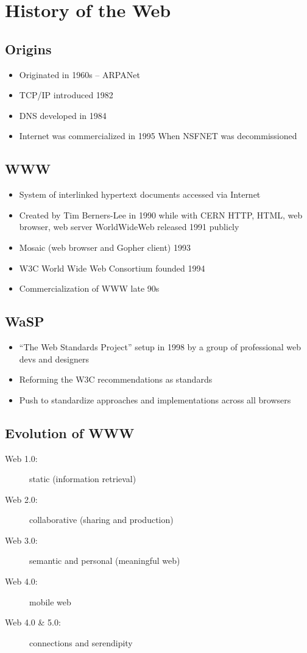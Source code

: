 \section{History of the Web}
\subsection{Origins}
\begin{itemize}
	\item Originated in 1960s -- ARPANet
	\item TCP/IP introduced 1982
	\item DNS developed in 1984
	\item Internet was commercialized in 1995
	\subitem When NSFNET was decommissioned
\end{itemize}

\subsection{WWW}
\begin{itemize}
	\item System of interlinked hypertext documents accessed via Internet
	\item Created by Tim Berners-Lee in 1990 while with CERN
	\subitem HTTP, HTML, web browser, web server
	\subitem WorldWideWeb released 1991 publicly
	\item Mosaic (web browser and Gopher client) 1993
	\item W3C World Wide Web Consortium founded 1994
	\item Commercialization of WWW late 90s
\end{itemize}

\subsection{WaSP}
\begin{itemize}
	\item ``The Web Standards Project'' setup in 1998 by a group of professional web devs and designers
	\item Reforming the W3C recommendations as standards
	\item Push to standardize approaches and implementations across all browsers
\end{itemize}

\subsection{Evolution of WWW}
\begin{description}
	\item[Web 1.0:] static (information retrieval)
	\item[Web 2.0:] collaborative (sharing and production)
	\item[Web 3.0:] semantic and personal (meaningful web)
	\item[Web 4.0:] mobile web
	\item[Web 4.0 \& 5.0:] connections and serendipity
\end{description}

